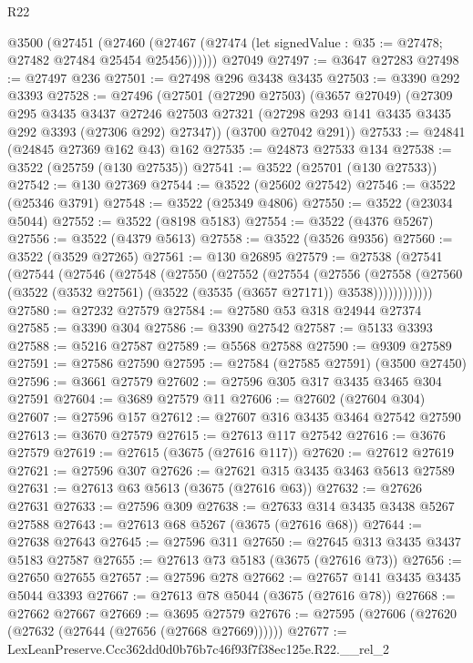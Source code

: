 \begin{lexlean}{R22}
\begin{coremodule}
    @3500
      (@27451
        (@27460 (@27467 (@27474 (let signedValue : @35 := @27478; @27482 @27484 @25454 @25456))))))
    @27049
@27497 := @3647 @27283
@27498 := @27497 @236
@27501 := @27498 @296 @3438 @3435
@27503 := @3390 @292 @3393
@27528 := @27496
    (@27501
      (@27290 @27503)
      (@3657 @27049)
      (@27309
        @295
        @3435
        @3437
        @27246
        @27503
        @27321
        (@27298 @293 @141 @3435 @3435 @292 @3393 (@27306 @292) @27347))
      (@3700 @27042 @291))
@27533 := @24841 (@24845 @27369 @162 @43) @162
@27535 := @24873 @27533 @134
@27538 := @3522 (@25759 (@130 @27535))
@27541 := @3522 (@25701 (@130 @27533))
@27542 := @130 @27369
@27544 := @3522 (@25602 @27542)
@27546 := @3522 (@25346 @3791)
@27548 := @3522 (@25349 @4806)
@27550 := @3522 (@23034 @5044)
@27552 := @3522 (@8198 @5183)
@27554 := @3522 (@4376 @5267)
@27556 := @3522 (@4379 @5613)
@27558 := @3522 (@3526 @9356)
@27560 := @3522 (@3529 @27265)
@27561 := @130 @26895
@27579 := @27538
    (@27541
      (@27544
        (@27546
          (@27548
            (@27550
              (@27552
                (@27554
                  (@27556
                    (@27558
                      (@27560 (@3522 (@3532 @27561) (@3522 (@3535 (@3657 @27171)) @3538))))))))))))
@27580 := @27232 @27579
@27584 := @27580 @53 @318 @24944 @27374
@27585 := @3390 @304
@27586 := @3390 @27542
@27587 := @5133 @3393
@27588 := @5216 @27587
@27589 := @5568 @27588
@27590 := @9309 @27589
@27591 := @27586 @27590
@27595 := @27584 (@27585 @27591) (@3500 @27450)
@27596 := @3661 @27579
@27602 := @27596 @305 @317 @3435 @3465 @304 @27591
@27604 := @3689 @27579 @11
@27606 := @27602 (@27604 @304)
@27607 := @27596 @157
@27612 := @27607 @316 @3435 @3464 @27542 @27590
@27613 := @3670 @27579
@27615 := @27613 @117 @27542
@27616 := @3676 @27579
@27619 := @27615 (@3675 (@27616 @117))
@27620 := @27612 @27619
@27621 := @27596 @307
@27626 := @27621 @315 @3435 @3463 @5613 @27589
@27631 := @27613 @63 @5613 (@3675 (@27616 @63))
@27632 := @27626 @27631
@27633 := @27596 @309
@27638 := @27633 @314 @3435 @3438 @5267 @27588
@27643 := @27613 @68 @5267 (@3675 (@27616 @68))
@27644 := @27638 @27643
@27645 := @27596 @311
@27650 := @27645 @313 @3435 @3437 @5183 @27587
@27655 := @27613 @73 @5183 (@3675 (@27616 @73))
@27656 := @27650 @27655
@27657 := @27596 @278
@27662 := @27657 @141 @3435 @3435 @5044 @3393
@27667 := @27613 @78 @5044 (@3675 (@27616 @78))
@27668 := @27662 @27667
@27669 := @3695 @27579
@27676 := @27595 (@27606 (@27620 (@27632 (@27644 (@27656 (@27668 @27669))))))
@27677 := LexLeanPreserve.Ccc362dd0d0b76b7c46f93f7f38ec125e.R22.__rel_2

\end{coremodule}
\end{lexlean}
